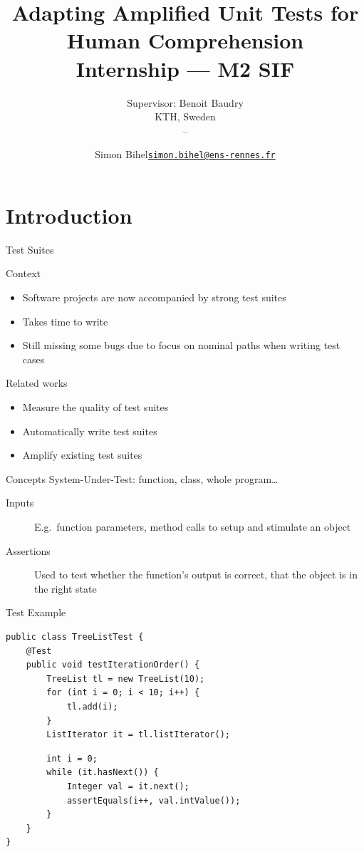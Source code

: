 \documentclass[aspectratio=169,dvipsnames]{beamer}
\title{Adapting Amplified Unit Tests for Human Comprehension\\\large{Internship --- M2 SIF}}
\subtitle{Supervisor: Benoit Baudry\\KTH, Sweden\\\displaydate{startdate}--\displaydate{enddate}}
\date{\displaydate{defensedate}}
\author{%
  Simon Bihel\hfill\href{mailto:simon.bihel@ens-rennes.fr}{\nolinkurl{simon.bihel@ens-rennes.fr}}\\
}
\institute{%
  University of Rennes I \\
  \'Ecole Normale Sup\'erieure de Rennes
}
\begin{document}
\maketitle


\section{Introduction}

\begin{frame}{Test Suites}
  \begin{block}{Context}
    \begin{itemize}
      \item Software projects are now accompanied by strong test suites
      \item Takes time to write
      \item Still missing some bugs due to focus on nominal paths when writing test cases
    \end{itemize}
  \end{block}

  \pause{}

  \begin{block}{Related works}
    \begin{itemize}
      \item Measure the quality of test suites
      \item Automatically write test suites
      \item \alert{Amplify} existing test suites
    \end{itemize}
  \end{block}
\end{frame}

\begin{frame}{Concepts}
  System-Under-Test: function, class, whole program\dots
  \begin{description}
    \item[Inputs] E.g.\ function parameters, method calls to setup and stimulate an object
    \item[Assertions] Used to test whether the function's output is correct, that the object is in the right state
  \end{description}
\end{frame}
\begin{frame}[fragile]{Test Example}
  \vspace*{-1em}
  \begin{verbatim}
public class TreeListTest {
    @Test
    public void testIterationOrder() {
        TreeList tl = new TreeList(10);
        for (int i = 0; i < 10; i++) {
            tl.add(i);
        }
        ListIterator it = tl.listIterator();
  \end{verbatim}
  \begin{verbatim}
        int i = 0;
        while (it.hasNext()) {
            Integer val = it.next();
            assertEquals(i++, val.intValue());
        }
    }
}
  \end{verbatim}
\end{frame}
\end{document}
